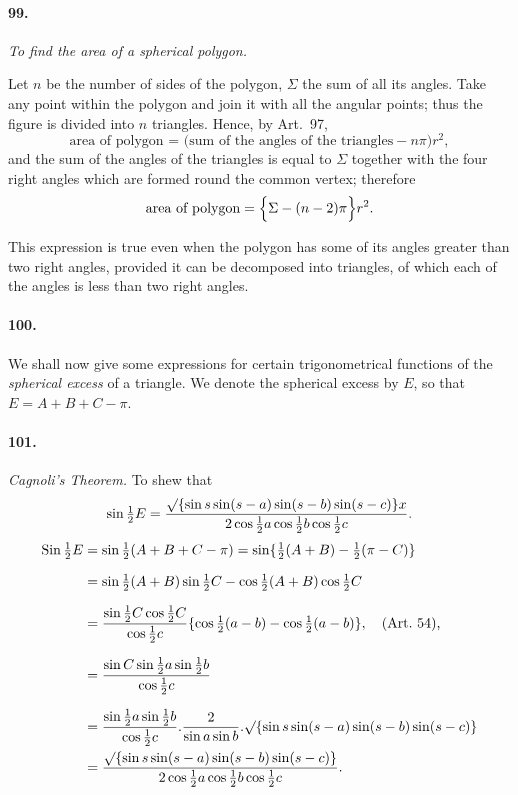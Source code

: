 \documentclass{book}[2004/02/16]
\providecommand{\centerdot}{.}
\begin{document}
\begin{mainmatter}
\begin{spacing}{1.3}
\paragraph{99.} \textit{To find the area of a spherical polygon.}

Let $n$ be the number of sides of the polygon, $\Sigma$ the sum of all
its angles. Take any point within the polygon and join it with
all the angular points; thus the figure is divided into $n$ triangles.
Hence, by Art.~97,
\[
  \text{area of polygon
= (sum of the angles of the triangles} - n\pi)r^2,
\]
and the sum of the angles of the triangles is equal to $\Sigma$ together
with the four right angles which are formed round the common
vertex; therefore
\[
  \text{area of polygon} = \Bigl\{\Sigma - (n-2)\pi \Bigr\} r^2.
\]

This expression is true even when the polygon has some of its
angles greater than two right angles, provided it can be decomposed
into triangles, of which each of the angles is less than two
right angles.

\paragraph{100.} We shall now give some expressions for certain trigonometrical
functions of the \textit{spherical excess} of a triangle. We denote
the spherical excess by $E$, so that $E=A+B+C-\pi$.

\paragraph{101.} \textit{Cagnoli's Theorem.} To shew that
\[
  \sin\tfrac{1}{2}E
= \dfrac{\surd\{\sin s \sin(s-a) \sin(s-b) \sin(s-c) \} x}
{2\cos\tfrac{1}{2}a \cos\tfrac{1}{2}b \cos\tfrac{1}{2}c }.
\]
\begin{align*}
   \operatorname{Sin}\tfrac{1}{2}E
&= \sin\tfrac{1}{2}(A+B+C-\pi)
 = \sin\{\tfrac{1}{2}(A+B) - \tfrac{1}{2}(\pi-C) \}
\\[1.5ex]
&= \sin\tfrac{1}{2}(A+B) \sin\tfrac{1}{2}C
 - \cos\tfrac{1}{2}(A+B) \cos\tfrac{1}{2}C
\\[1.5ex]
&= \dfrac{\sin\tfrac{1}{2}C \cos\tfrac{1}{2}C }{\cos\tfrac{1}{2}c }
   \{\cos\tfrac{1}{2}(a-b) - \cos\tfrac{1}{2}(a-b) \},
   \quad \text{(Art.~54),}
\\[1.5ex]
&= \dfrac{\sin C \sin\tfrac{1}{2}a \sin\tfrac{1}{2}b }{\cos\tfrac{1}{2}c}
\\[1.5ex]
&= \frac{\sin\tfrac{1}{2}a\sin\tfrac{1}{2}b}{\cos\tfrac{1}{2}c}\centerdot
   \frac{2}{\sin a\sin b} \centerdot
   \surd\{\sin s\sin(s-a)\sin(s-b)\sin(s-c) \}\\
&= \frac{\surd\{\sin s\sin(s-a)\sin(s-b)\sin(s-c) \} }
        {2\cos\tfrac{1}{2}a \cos\tfrac{1}{2}b \cos\tfrac{1}{2}c }.
\end{align*}


\end{spacing}
\end{mainmatter}
\end{document}
